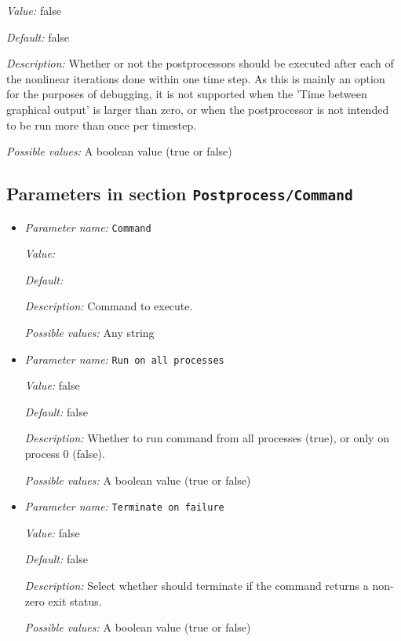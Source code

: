 \begin{itemize}
{\it Value:} false


{\it Default:} false


{\it Description:} Whether or not the postprocessors should be executed after each of the nonlinear iterations done within one time step. As this is mainly an option for the purposes of debugging, it is not supported when the 'Time between graphical output' is larger than zero, or when the postprocessor is not intended to be run more than once per timestep.


{\it Possible values:} A boolean value (true or false)
\end{itemize}



\subsection{Parameters in section \tt Postprocess/Command}
\label{parameters:Postprocess/Command}

\begin{itemize}
\item {\it Parameter name:} {\tt Command}
\label{parameters:Postprocess/Command/Command}


{\it Value:} 


{\it Default:} 


{\it Description:} Command to execute.


{\it Possible values:} Any string
\item {\it Parameter name:} {\tt Run on all processes}
\label{parameters:Postprocess/Command/Run on all processes}


{\it Value:} false


{\it Default:} false


{\it Description:} Whether to run command from all processes (true), or only on process 0 (false).


{\it Possible values:} A boolean value (true or false)
\item {\it Parameter name:} {\tt Terminate on failure}
\label{parameters:Postprocess/Command/Terminate on failure}


{\it Value:} false


{\it Default:} false


{\it Description:} Select whether \aspect{} should terminate if the command returns a non-zero exit status.


{\it Possible values:} A boolean value (true or false)
\end{itemize}

